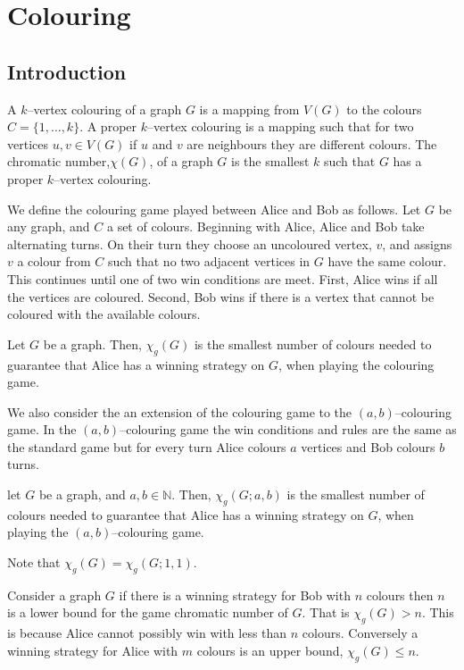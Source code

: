 \chapter{Colouring}

\section{Introduction}
A $k$--vertex colouring of a graph $G$ is a mapping from $V(G)$ to the colours $C=\{1,\dots,k\}$. A proper $k$--vertex colouring is a mapping such that for two vertices $u,v\in V(G)$ if $u$ and $v$ are neighbours they are different colours. The chromatic number,$\chi(G)$, of a graph $G$ is the smallest $k$ such that $G$ has a proper  $k$--vertex colouring.

We define the colouring game played between Alice and Bob as follows. Let $G$ be any graph, and $C$ a set of colours. Beginning with Alice, Alice and Bob take alternating turns. On their turn they choose an uncoloured vertex, $v$, and assigns $v$ a colour from $C$ such that no two adjacent vertices in $G$ have the same colour. This continues until one of two win conditions are meet. First, Alice wins if all the vertices are coloured. Second, Bob wins if there is a vertex that cannot be coloured with the available colours.


\begin{definition}
    Let $G$ be a graph. Then, $\chi_g(G)$ is the smallest number of colours needed to guarantee that Alice has a winning strategy on $G$, when playing the colouring game.     
\end{definition}

We also consider the an extension of the colouring game to the $(a,b)$--colouring game. In the $(a,b)$--colouring game the win conditions and rules are the same as the standard game but for every turn Alice colours $a$ vertices and Bob colours $b$ turns.
\begin{definition}
    let $G$ be a graph, and $a,b\in\mathbb{N}$. 
     Then, $\chi_g(G;a,b)$ is the smallest number of colours needed to guarantee that Alice has a winning strategy on $G$, when playing the $(a,b)$--colouring game. 
\end{definition}
Note that $\chi_g(G) = \chi_g(G;1,1)$.

Consider a graph $G$ if there is a winning strategy for Bob with $n$ colours then $n$ is a lower bound for the game chromatic number of $G$. That is $\chi_g(G)>n$. This is because Alice cannot possibly win with less than $n$ colours. Conversely a winning strategy for Alice with $m$ colours is an upper bound,  $\chi_g(G)\leq n$.

